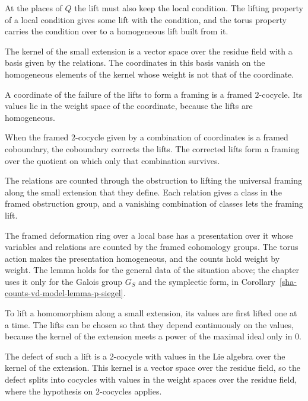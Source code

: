 At the places of $Q$ the lift must also keep the local condition. The lifting property of a local condition gives some lift with the condition, and the torus property carries the condition over to a homogeneous lift built from it.

The kernel of the small extension is a vector space over the residue field with a basis given by the relations. The coordinates in this basis vanish on the homogeneous elements of the kernel whose weight is not that of the coordinate.

A coordinate of the failure of the lifts to form a framing is a framed $2$-cocycle. Its values lie in the weight space of the coordinate, because the lifts are homogeneous.

When the framed $2$-cocycle given by a combination of coordinates is a framed coboundary, the coboundary corrects the lifts. The corrected lifts form a framing over the quotient on which only that combination survives.

The relations are counted through the obstruction to lifting the universal framing along the small extension that they define. Each relation gives a class in the framed obstruction group, and a vanishing combination of classes lets the framing lift.

The framed deformation ring over a local base has a presentation over it whose variables and relations are counted by the framed cohomology groups. The torus action makes the presentation homogeneous, and the counts hold weight by weight. The lemma holds for the general data of the situation above; the chapter uses it only for the Galois group $G_S$ and the symplectic form, in Corollary~\ref{sha-counts-vd-model-lemma-p-siegel}.

To lift a homomorphism along a small extension, its values are first lifted one at a time. The lifts can be chosen so that they depend continuously on the values, because the kernel of the extension meets a power of the maximal ideal only in $0$.

The defect of such a lift is a $2$-cocycle with values in the Lie algebra over the kernel of the extension. This kernel is a vector space over the residue field, so the defect splits into cocycles with values in the weight spaces over the residue field, where the hypothesis on $2$-cocycles applies.

